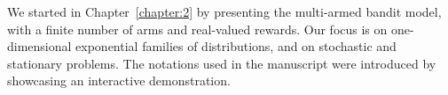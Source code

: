 We started in Chapter~\ref{chapter:2} by presenting the multi-armed bandit model, with a finite number of arms and real-valued rewards.
Our focus is on one-dimensional exponential families of distributions, and on stochastic and stationary problems.
The notations used in the manuscript were introduced by showcasing an interactive demonstration.



